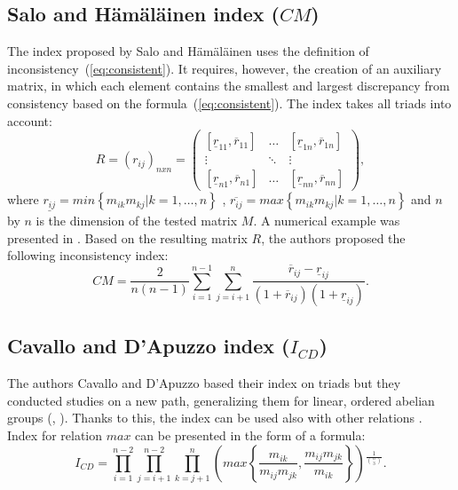 \subsection{Salo and Hämäläinen index ($\textit{CM}$)}

The index proposed by Salo and Hämäläinen \cite{SALO1995} uses the definition of inconsistency~(\ref{eq:consistent}). It requires, however, the creation of an auxiliary matrix, in which each element contains the smallest and largest discrepancy from consistency based on the formula~(\ref{eq:consistent}). The index takes all triads into account:
	\begin{equation} 
		R=(r_{ij})_{nxn}=\left(\begin{array}{ccc}
			[\underline{r}_{11},\overline{r}_{11}] & \ldots & [\underline{r}_{1n},\overline{r}_{1n}]\\
			\vdots & \ddots & \vdots\\{}
			[\underline{r}_{n1},\overline{r}_{n1}] & \ldots & [\underline{r}_{nn},\overline{r}_{nn}]
		\end{array}\right),
	\end{equation}
 where $\underline{r_{ij}}=min\left\{ m_{ik}m_{kj}\bigl\vert k=1,\ldots,n\right\}$ , $\overline{r_{ij}}=\textit{max}\left\{ m_{ik}m_{kj}\bigl\vert k=1,\ldots,n\right\}$ and $n$ by $n$ is the dimension of the tested matrix $M$. A numerical example was presented in \cite{Brunelli2015}. Based on the resulting matrix $R$, the authors proposed the following inconsistency index:
 	\begin{equation} 
		\textit{CM}=\frac{2}{n(n-1)}\sum_{i=1}^{n-1}\sum_{j=i+1}^{n}\frac{\overline{r}_{ij}-\underline{r}_{ij}}{\left(1+\overline{r}_{ij}\right)\left(1+\underline{r}_{ij}\right)}.
	 \end{equation}
 

\subsection{Cavallo and D’Apuzzo index ($\textit{I}_{\textit{CD}}$)}

The authors Cavallo and D'Apuzzo based their index on triads but they conducted studies on a new path, generalizing them for linear, ordered abelian groups (\cite{Cavallo2009}, \cite{Cavallo2010}). Thanks to this, the index can be used also with other relations \cite{Brunelli2013}. Index for relation $\textit{max}$ can be presented in the form of a formula:
	\begin{equation} 
		\label{eq:CavDAp}
		I_{CD}=\prod_{i=1}^{n-2}\prod_{j=i+1}^{n-2}\prod_{k=j+1}^{n}\left(\textit{max}\left\{ \frac{m_{ik}}{m_{ij}m_{jk}},\frac{m_{ij}m_{jk}}{m_{ik}}\right\} \right){}^{\frac{1}{\binom{n}{3}}}.
	 \end{equation}
 

